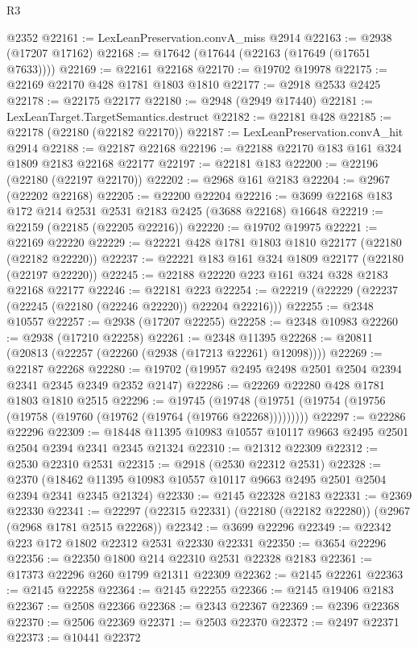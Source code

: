 \begin{lexlean}{R3}
\begin{coremodule}
    @2352
@22161 := LexLeanPreservation.convA_miss @2914
@22163 := @2938 (@17207 @17162)
@22168 := @17642 (@17644 (@22163 (@17649 (@17651 @7633))))
@22169 := @22161 @22168
@22170 := @19702 @19978
@22175 := @22169 @22170 @428 @1781 @1803 @1810
@22177 := @2918 @2533 @2425
@22178 := @22175 @22177
@22180 := @2948 (@2949 @17440)
@22181 := LexLeanTarget.TargetSemantics.destruct
@22182 := @22181 @428
@22185 := @22178 (@22180 (@22182 @22170))
@22187 := LexLeanPreservation.convA_hit @2914
@22188 := @22187 @22168
@22196 := @22188 @22170 @183 @161 @324 @1809 @2183 @22168 @22177
@22197 := @22181 @183
@22200 := @22196 (@22180 (@22197 @22170))
@22202 := @2968 @161 @2183
@22204 := @2967 (@22202 @22168)
@22205 := @22200 @22204
@22216 := @3699 @22168 @183 @172 @214 @2531 @2531 @2183 @2425 (@3688 @22168) @16648
@22219 := @22159 (@22185 (@22205 @22216))
@22220 := @19702 @19975
@22221 := @22169 @22220
@22229 := @22221 @428 @1781 @1803 @1810 @22177 (@22180 (@22182 @22220))
@22237 := @22221 @183 @161 @324 @1809 @22177 (@22180 (@22197 @22220))
@22245 := @22188 @22220 @223 @161 @324 @328 @2183 @22168 @22177
@22246 := @22181 @223
@22254 := @22219 (@22229 (@22237 (@22245 (@22180 (@22246 @22220)) @22204 @22216)))
@22255 := @2348 @10557
@22257 := @2938 (@17207 @22255)
@22258 := @2348 @10983
@22260 := @2938 (@17210 @22258)
@22261 := @2348 @11395
@22268 := @20811 (@20813 (@22257 (@22260 (@2938 (@17213 @22261) @12098))))
@22269 := @22187 @22268
@22280 := @19702 (@19957 @2495 @2498 @2501 @2504 @2394 @2341 @2345 @2349 @2352 @2147)
@22286 := @22269 @22280 @428 @1781 @1803 @1810 @2515
@22296 := @19745
    (@19748 (@19751 (@19754 (@19756 (@19758 (@19760 (@19762 (@19764 (@19766 @22268)))))))))
@22297 := @22286 @22296
@22309 := @18448 @11395 @10983 @10557 @10117 @9663 @2495 @2501 @2504 @2394 @2341 @2345 @21324
@22310 := @21312 @22309
@22312 := @2530 @22310 @2531
@22315 := @2918 (@2530 @22312 @2531)
@22328 := @2370
    (@18462 @11395 @10983 @10557 @10117 @9663 @2495 @2501 @2504 @2394 @2341 @2345 @21324)
@22330 := @2145 @22328 @2183
@22331 := @2369 @22330
@22341 := @22297 (@22315 @22331) (@22180 (@22182 @22280)) (@2967 (@2968 @1781 @2515 @22268))
@22342 := @3699 @22296
@22349 := @22342 @223 @172 @1802 @22312 @2531 @22330 @22331
@22350 := @3654 @22296
@22356 := @22350 @1800 @214 @22310 @2531 @22328 @2183
@22361 := @17373 @22296 @260 @1799 @21311 @22309
@22362 := @2145 @22261
@22363 := @2145 @22258
@22364 := @2145 @22255
@22366 := @2145 @19406 @2183
@22367 := @2508 @22366
@22368 := @2343 @22367
@22369 := @2396 @22368
@22370 := @2506 @22369
@22371 := @2503 @22370
@22372 := @2497 @22371
@22373 := @10441 @22372

\end{coremodule}
\end{lexlean}
